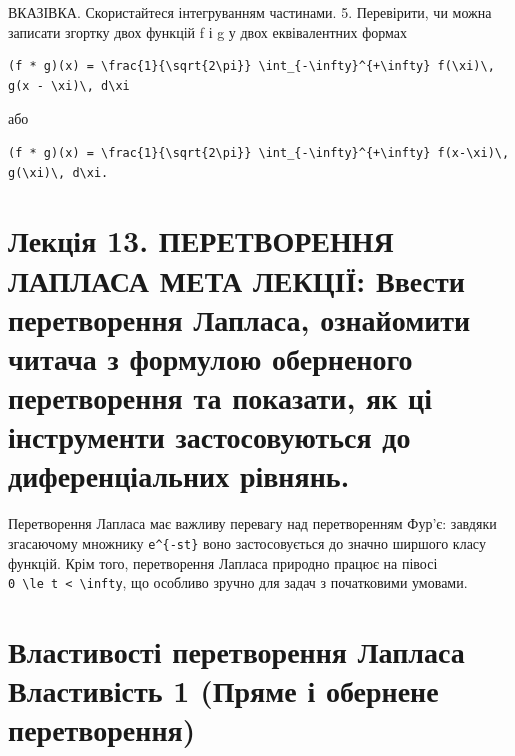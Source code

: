 \documentclass[
  ukrainian,
]{article}
\begin{document}
ВКАЗІВКА. Скористайтеся інтегруванням частинами. 5. Перевірити, чи можна
записати згортку двох функцій f і g у двох еквівалентних формах

\begin{verbatim}
(f * g)(x) = \frac{1}{\sqrt{2\pi}} \int_{-\infty}^{+\infty} f(\xi)\, g(x - \xi)\, d\xi
\end{verbatim}

або

\begin{verbatim}
(f * g)(x) = \frac{1}{\sqrt{2\pi}} \int_{-\infty}^{+\infty} f(x-\xi)\, g(\xi)\, d\xi.
\end{verbatim}

\section{Лекція 13. ПЕРЕТВОРЕННЯ ЛАПЛАСА МЕТА ЛЕКЦІЇ: Ввести
перетворення Лапласа, ознайомити читача з формулою оберненого
перетворення та показати, як ці інструменти застосовуються до
диференціальних
рівнянь.}\label{ux43bux435ux43aux446ux456ux44f-13.-ux43fux435ux440ux435ux442ux432ux43eux440ux435ux43dux43dux44f-ux43bux430ux43fux43bux430ux441ux430-ux43cux435ux442ux430-ux43bux435ux43aux446ux456ux457-ux432ux432ux435ux441ux442ux438-ux43fux435ux440ux435ux442ux432ux43eux440ux435ux43dux43dux44f-ux43bux430ux43fux43bux430ux441ux430-ux43eux437ux43dux430ux439ux43eux43cux438ux442ux438-ux447ux438ux442ux430ux447ux430-ux437-ux444ux43eux440ux43cux443ux43bux43eux44e-ux43eux431ux435ux440ux43dux435ux43dux43eux433ux43e-ux43fux435ux440ux435ux442ux432ux43eux440ux435ux43dux43dux44f-ux442ux430-ux43fux43eux43aux430ux437ux430ux442ux438-ux44fux43a-ux446ux456-ux456ux43dux441ux442ux440ux443ux43cux435ux43dux442ux438-ux437ux430ux441ux442ux43eux441ux43eux432ux443ux44eux442ux44cux441ux44f-ux434ux43e-ux434ux438ux444ux435ux440ux435ux43dux446ux456ux430ux43bux44cux43dux438ux445-ux440ux456ux432ux43dux44fux43dux44c.}

Перетворення Лапласа має важливу перевагу над перетворенням Фур'є:
завдяки згасаючому множнику \texttt{e\^{}\{-st\}} воно застосовується до
значно ширшого класу функцій. Крім того, перетворення Лапласа природно
працює на півосі
\texttt{0\ \textbackslash{}le\ t\ \textless{}\ \textbackslash{}infty},
що особливо зручно для задач з початковими умовами.

\section{Властивості перетворення Лапласа Властивість 1 (Пряме і
обернене
перетворення)}\label{ux432ux43bux430ux441ux442ux438ux432ux43eux441ux442ux456-ux43fux435ux440ux435ux442ux432ux43eux440ux435ux43dux43dux44f-ux43bux430ux43fux43bux430ux441ux430-ux432ux43bux430ux441ux442ux438ux432ux456ux441ux442ux44c-1-ux43fux440ux44fux43cux435-ux456-ux43eux431ux435ux440ux43dux435ux43dux435-ux43fux435ux440ux435ux442ux432ux43eux440ux435ux43dux43dux44f}
\end{document}
